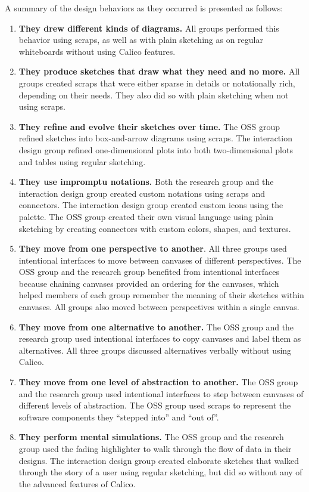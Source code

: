 \documentclass[12pt,fleqn]{ucithesis}
\begin{document}
A summary of the design behaviors as they occurred is presented as follows:

\begin{enumerate}
	\item \textbf{They drew different kinds of diagrams.} All groups performed this behavior using scraps, as well as with plain sketching as on regular whiteboards without using Calico features.
	\item \textbf{They produce sketches that draw what they need and no more.} All groups created scraps that were either sparse in details or notationally rich, depending on their needs. They also did so with plain sketching when not using scraps.
	\item \textbf{They refine and evolve their sketches over time.} The OSS group refined sketches into box-and-arrow diagrams using scraps. The interaction design group refined one-dimensional plots into both two-dimensional plots and tables using regular sketching.
	\item \textbf{They use impromptu notations.} Both the research group and the interaction design group created custom notations using scraps and connectors. The interaction design group created custom icons using the palette. The OSS group created their own visual language using plain sketching by creating connectors with custom colors, shapes, and textures.
	\item \textbf{They move from one perspective to another}. All three groups used intentional interfaces to move between canvases of different perspectives. The OSS group and the research group benefited from intentional interfaces because chaining canvases provided an ordering for the canvases, which helped members of each group remember the meaning of their sketches within canvases. All groups also moved between perspectives within a single canvas.
	\item \textbf{They move from one alternative to another.} The OSS group and the research group used intentional interfaces to copy canvases and label them as alternatives. All three groups discussed alternatives verbally without using Calico.
	\item \textbf{They move from one level of abstraction to another.} The OSS group and the research group used intentional interfaces to step between canvases of different levels of abstraction. The OSS group used scraps to represent the software components they ``stepped into'' and ``out of''.
	\item \textbf{They perform mental simulations.} The OSS group and the research group used the fading highlighter to walk through the flow of data in their designs. The interaction design group created elaborate sketches that walked through the story of a user using regular sketching, but did so without any of the advanced features of Calico.

\end{enumerate}
\end{document}
